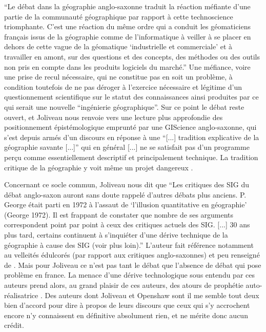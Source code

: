 \enquote{Le débat dans la géographie anglo-saxonne traduit la réaction méfiante d'une partie de la communauté géographique par rapport à cette technoscience triomphante. C'est une réaction du même ordre qui a conduit les géomaticiens français issus de la géographie comme de l'informatique à veiller à se placer en dehors de cette vague de la géomatique \enquote{industrielle et commerciale} et à travailler en amont, sur des questions et des concepts, des méthodes ou des outils non pris en compte dans les produits logiciels du marché.} Une méfiance, voire une prise de recul nécessaire, qui ne constitue pas en soit un problème, à condition toutefois de ne pas déroger à l'exercice nécessaire et légitime d'un questionnement scientifique sur le statut des connaissances ainsi produites par ce qui serait une nouvelle \enquote{ingénierie géographique}. Sur ce point le débat reste ouvert, et Joliveau nous renvoie vers une lecture plus approfondie des positionnement épistémologique emprunté par une GIScience anglo-saxonne, qui s'est depuis armés d'un discours en réponse à une \enquote{[...] tradition explicative de la géographie savante [...]} qui en général { [...] ne se satisfait pas d'un programme perçu comme essentiellement descriptif et principalement technique. La tradition critique de la géographie y voit même un projet dangereux} \autocite[474-477]{Joliveau2004}.

Concernant ce socle commun, Joliveau nous dit que \enquote{Les critiques des SIG du débat anglo-saxon auront sans doute rappelé d'autres débats plus anciens. P. George était parti en 1972 à l'assaut de \enquote{l'illusion quantitative en géographie} (George 1972). Il est frappant de constater que nombre de ses arguments correspondent point par point à ceux des critiques actuels des SIG. [...] 30 ans plus tard, certains continuent à s'inquiéter d'une dérive technique de la géographie à cause des SIG (voir plus loin).} \autocite[477]{Joliveau2004} L'auteur fait référence notamment au velleités édulcorés (par rapport aux critiques anglo-saxonnes) et peu renseigné de \autocite{Staszak2001}. Mais pour Joliveau ce n'est pas tant le débat que l'absence de débat qui pose problème en france. La menace d'une dérive technologique sous entendu par ces auteurs prend alors, au grand plaisir de ces auteurs, des atours de prophétie auto-réalisatrice . Des auteurs dont Joliveau  et Openshaw sont il me semble tout deux bien d'accord pour dire à propos de leurs discours que ceux qui s'y accrochent encore n'y connaissent en définitive absolument rien, et ne mérite donc aucun crédit.

